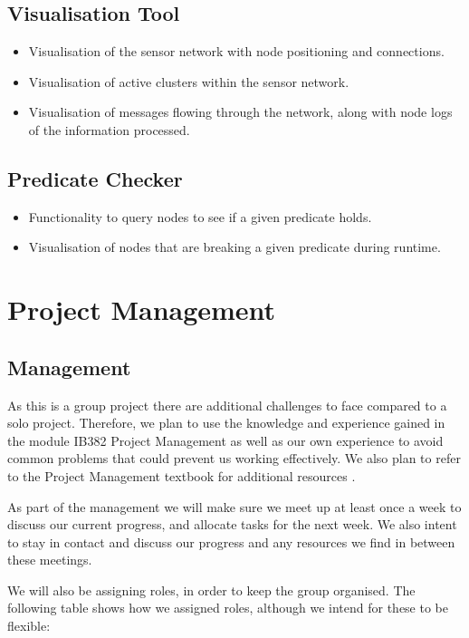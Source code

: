 \documentclass[a4paper]{article}
\begin{document}
\subsection{Visualisation Tool}
\begin{itemize}
	\item Visualisation of the sensor network with node positioning and connections.
	\item Visualisation of active clusters within the sensor network.
	\item Visualisation of messages flowing through the network, along with node logs of the information processed.
\end{itemize}

\subsection{Predicate Checker}
\begin{itemize}
	\item Functionality to query nodes to see if a given predicate holds.
	\item Visualisation of nodes that are breaking a given predicate during runtime.
\end{itemize}



\section{Project Management}

\subsection{Management}

As this is a group project there are additional challenges to face compared to a solo project. Therefore, we plan to use the knowledge and experience gained in the module IB382 Project Management \cite{IB382} as well as our own experience to avoid common problems that could prevent us working effectively. We also plan to refer to the Project Management textbook for additional resources \cite{PMTextBook}.

As part of the management we will make sure we meet up at least once a week to discuss our current progress, and allocate tasks for the next week. We also intent to stay in contact and discuss our progress and any resources we find in between these meetings.

We will also be assigning roles, in order to keep the group organised. The following table shows how we assigned roles, although we intend for these to be flexible:
\end{document}
